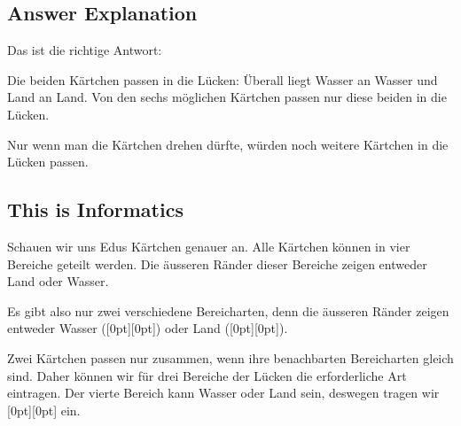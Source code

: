 \documentclass[a4paper,11pt]{report}
\newcommand{\taskGraphicsFolder}{..}
\begin{document}
\endgroup

\subsection*{Answer Explanation}

Das ist die richtige Antwort:

{\centering%
\par}

Die beiden Kärtchen passen in die Lücken: Überall liegt Wasser an Wasser und Land an Land. Von den sechs möglichen Kärtchen passen nur diese beiden in die Lücken.

Nur wenn man die Kärtchen drehen dürfte, würden noch weitere Kärtchen in die Lücken passen.


\subsection*{This is Informatics}

Schauen wir uns Edus Kärtchen genauer an. Alle Kärtchen können in vier Bereiche geteilt werden. Die äusseren Ränder dieser Bereiche zeigen entweder Land oder Wasser.

{\centering%
\par}

Es gibt also nur zwei verschiedene Bereicharten, denn die äusseren Ränder zeigen entweder Wasser (\raisebox{-0.5ex}[0pt][0pt]{}) oder Land (\raisebox{-0.5ex}[0pt][0pt]{}).

{\centering%
\par}

Zwei Kärtchen passen nur zusammen, wenn ihre benachbarten Bereicharten gleich sind. Daher können wir für drei Bereiche der Lücken die erforderliche Art eintragen. Der vierte Bereich kann Wasser oder Land sein, deswegen tragen wir \raisebox{-0.5ex}[0pt][0pt]{} ein.
\end{document}
